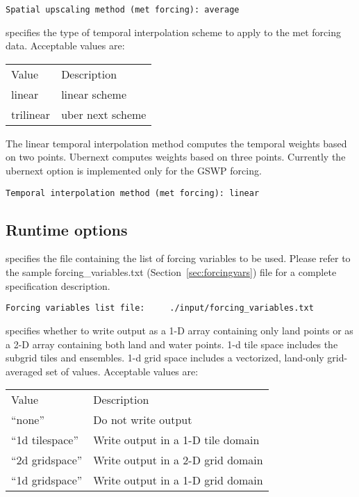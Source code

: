  \begin{Verbatim}[frame=single]
Spatial upscaling method (met forcing): average
 \end{Verbatim}

 
 specifies the type of temporal interpolation scheme to 
 apply to the met forcing data.
 Acceptable values are:

 \begin{tabular}{ll}
 Value     & Description                      \\
 linear    & linear scheme                    \\
 trilinear & uber next scheme                 \\
 \end{tabular}

 The linear temporal interpolation method computes the temporal weights
 based on two points. Ubernext computes weights based on three points.
 Currently the ubernext option is implemented only for the GSWP forcing.
 

 \begin{Verbatim}[frame=single]
Temporal interpolation method (met forcing): linear
 \end{Verbatim}

 
 \subsection{Runtime options} \label{ssec:runtimeopts}
 

 
  specifies the file containing
 the list of forcing variables to be used. Please refer to the 
 sample forcing\_variables.txt (Section~\ref{sec:forcingvars})
 file for a complete specification description. 
 

 \begin{Verbatim}[frame=single]
Forcing variables list file:     ./input/forcing_variables.txt
 \end{Verbatim}

 
  specifies whether to write output as a
 1-D array containing only land points or as a 2-D array containing
 both land and water points. 1-d tile space includes the subgrid 
 tiles and ensembles. 1-d grid space includes a vectorized, land-only
 grid-averaged set of values. 
 Acceptable values are:

 \begin{tabular}{ll}
 Value          & Description                         \\
 ``none''         & Do not write output               \\
 ``1d tilespace'' & Write output in a 1-D tile domain \\
 ``2d gridspace'' & Write output in a 2-D grid domain \\
 ``1d gridspace'' & Write output in a 1-D grid domain \\
 \end{tabular}
 


